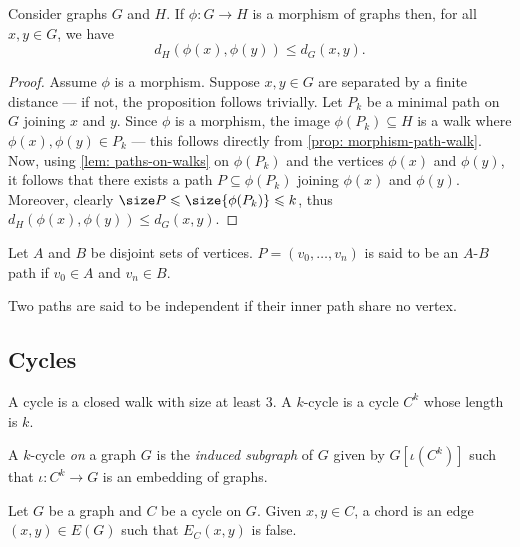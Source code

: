 \begin{corollary}
\label{cor: morphism-cycle}
Consider graphs \(G\) and \(H\). If \(\phi: G \to H\) is a morphism of
graphs then, for all \(x, y \in G\), we have
\[
  d_H(\phi(x), \phi(y)) \leq d_G(x, y).
\]
\end{corollary}

\begin{proof}
Assume \(\phi\) is a morphism. Suppose \(x, y \in G\) are separated by a
finite distance --- if not, the proposition follows trivially. Let \(P_k\) be
a minimal path on \(G\) joining \(x\) and \(y\). Since \(\phi\) is a morphism,
the image \(\phi(P_k) \subseteq H\) is a walk where \(\phi(x), \phi(y) \in
P_k\) --- this follows directly from \cref{prop: morphism-path-walk}. Now,
using \cref{lem: paths-on-walks} on \(\phi(P_k)\) and the vertices \(\phi(x)\)
and \(\phi(y)\), it follows that there exists a path \(P \subseteq \phi(P_k)\)
joining \(\phi(x)\) and \(\phi(y)\). Moreover, clearly \(\size P \leq
\size{\phi(P_k)} \leq k\), thus \(d_H(\phi(x), \phi(y)) \leq d_G(x, y)\).
\end{proof}

\begin{definition}\label{def: A-B-path}
Let \(A\) and \(B\) be disjoint sets of vertices. \(P = (v_0, \dots, v_n)\) is
said to be an \(A\)-\(B\) path if \(v_0 \in A\) and \(v_n \in B\).
\end{definition}

\begin{definition}\label{def: independent-paths}
Two paths are said to be independent if their inner path share no vertex.
\end{definition}

\subsection{Cycles}

\begin{definition}\label{def: cycle}
A cycle is a closed walk with size at least \(3\). A \(k\)-cycle is a cycle
\(C^k\) whose length is \(k\).

A \(k\)-cycle \emph{on} a graph \(G\) is the \emph{induced subgraph} of \(G\)
given by \(G[\iota(C^k)]\) such that \(\iota: C^k \to G\) is an embedding of
graphs.
\end{definition}

\begin{definition}[Chords]\label{def: chord}
Let \(G\) be a graph and \(C\) be a cycle on \(G\). Given \(x, y \in C\), a
chord is an edge \((x, y) \in E(G)\) such that \(E_C(x, y)\) is false.
\end{definition}

